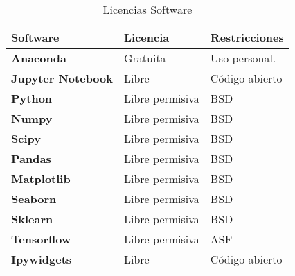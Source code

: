 \begin{table}[p]
	\centering
	\begin{tabularx}{\linewidth}{ p{} p{} p{\columnwidth}}
		\toprule
		\textbf{Software}    & \textbf{Licencia} & \textbf{Restricciones} \\
		\toprule		
		\textbf{Anaconda}              & Gratuita    & Uso personal.  \\
		\toprule	
		\textbf{Jupyter Notebook}              & Libre    & Código abierto \\
		\toprule			
		\textbf{Python}              & Libre permisiva    & BSD \\
		\toprule		
		\textbf{Numpy}              & Libre permisiva    & BSD \\
		\toprule		
		\textbf{Scipy}              & Libre permisiva    & BSD \\
		\toprule		
		\textbf{Pandas}               & Libre permisiva    & BSD \\
		\toprule		
		\textbf{Matplotlib}              & Libre permisiva    & BSD \\
		\toprule		
		\textbf{Seaborn}              & Libre permisiva    & BSD \\
		\toprule		
		\textbf{Sklearn}               & Libre permisiva    & BSD \\
		\toprule		
		\textbf{Tensorflow}              & Libre permisiva    & ASF \\
		\toprule		
		\textbf{Ipywidgets}              & Libre    & Código abierto \\
		\bottomrule
	\end{tabularx}
	\caption{Licencias Software}
\end{table}